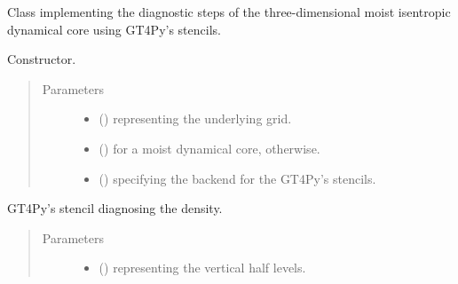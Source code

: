 \documentclass[letterpaper,10pt,english]{sphinxmanual}
\begin{document}
\begin{fulllineitems}
\label{\detokenize{api:dycore.diagnostic_isentropic.DiagnosticIsentropic}}
Class implementing the diagnostic steps of the three-dimensional moist isentropic dynamical core
using GT4Py’s stencils.

\begin{fulllineitems}
\label{\detokenize{api:dycore.diagnostic_isentropic.DiagnosticIsentropic.__init__}}
Constructor.
\begin{quote}\begin{description}
\item[{Parameters}] \leavevmode\begin{itemize}
\item {} 
 () \textendash{} {\hyperref[\detokenize{api:grids.grid_xyz.GridXYZ}]{}} representing the underlying grid.

\item {} 
 () \textendash{}  for a moist dynamical core,  otherwise.

\item {} 
 () \textendash{}  specifying the backend for the GT4Py’s stencils.

\end{itemize}

\end{description}\end{quote}

\end{fulllineitems}


\begin{fulllineitems}
\label{\detokenize{api:dycore.diagnostic_isentropic.DiagnosticIsentropic._stencil_diagnosing_air_density_defs}}
GT4Py’s stencil diagnosing the density.
\begin{quote}\begin{description}
\item[{Parameters}] \leavevmode\begin{itemize}
\item {} 
 () \textendash{}  representing the vertical half levels.


\end{itemize}
\end{description}
\end{quote}
\end{fulllineitems}
\end{fulllineitems}
\end{document}
